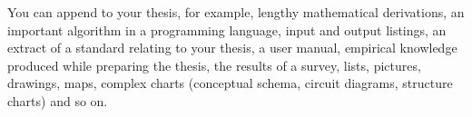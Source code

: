 \documentclass[12pt,a4paper,english
]{tutthesis}
\begin{document}
You can append to your thesis, for example, lengthy mathematical
derivations, an important algorithm in a programming language, input
and output listings, an extract of a standard relating to your thesis,
a user manual, empirical knowledge produced while preparing the
thesis, the results of a survey, lists, pictures, drawings, maps,
complex charts (conceptual schema, circuit diagrams, structure charts)
and so on.


%
\end{document}
